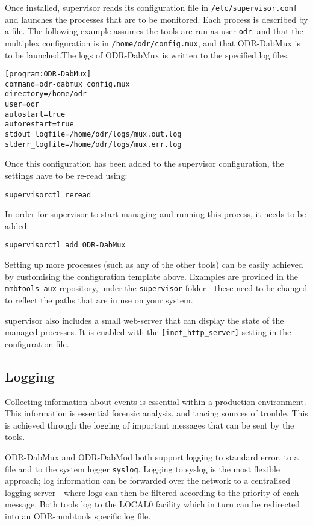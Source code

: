 Once installed, supervisor reads its configuration file in \texttt{/etc/supervisor.conf}
and launches the processes that are to be monitored. Each process is described
by a file. The following example assumes the tools are run as user \texttt{odr},
and that the multiplex configuration is in \texttt{/home/odr/config.mux}, and
that ODR-DabMux is to be launched.The logs of ODR-DabMux is written to the
specified log files.

\begin{lstlisting}
[program:ODR-DabMux]
command=odr-dabmux config.mux
directory=/home/odr
user=odr
autostart=true
autorestart=true
stdout_logfile=/home/odr/logs/mux.out.log
stderr_logfile=/home/odr/logs/mux.err.log
\end{lstlisting}

Once this configuration has been added to the supervisor configuration, the
settings have to be re-read using:
\begin{lstlisting}
supervisorctl reread
\end{lstlisting}

In order for supervisor to start managing and running this process, it needs to
be added:

\begin{lstlisting}
supervisorctl add ODR-DabMux
\end{lstlisting}

Setting up more processes (such as any of the other tools) can be easily
achieved by customising the configuration template above. Examples are provided
in the \texttt{mmbtools-aux} repository, under the \texttt{supervisor} folder -
these need to be changed to reflect the paths that are in use on your system.

supervisor also includes a small web-server that can display the state of the
managed processes. It is enabled with the \verb+[inet_http_server]+ setting in
the configuration file.

\subsection{Logging}
Collecting information about events is essential within a production environment.
This information is essential forensic analysis, and tracing sources of trouble.
This is achieved through the logging of important messages that can be sent by
the tools.

ODR-DabMux and ODR-DabMod both support logging to standard error, to a file and
to the system logger \texttt{syslog}. Logging to syslog is the most flexible
approach; log information can be forwarded over the network to a
centralised logging server - where logs can then be filtered according to the
priority of each message. Both tools log to the LOCAL0 facility which in turn
can be redirected into an ODR-mmbtools specific log file.


